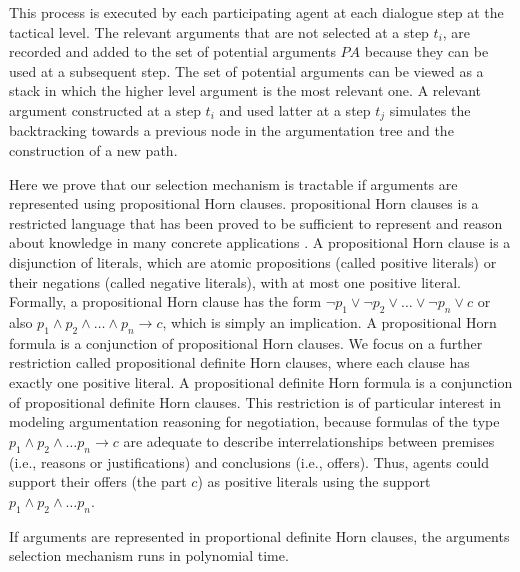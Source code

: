This process is executed by each participating agent at each dialogue step at the tactical level. The relevant arguments that
are not selected at a step $t_i$, are recorded and added to the set of potential arguments $PA$ because they can be used at a
subsequent step. The set of potential arguments can be viewed as a stack in which the higher level argument is the most relevant one.
A relevant argument constructed at a step $t_i$ and used latter at a step $t_j$ simulates the backtracking towards a previous node in
the argumentation tree and the construction of a new path.

Here we prove that our selection mechanism is tractable if arguments are represented using propositional Horn clauses.
propositional Horn clauses is a restricted language that has been proved to be sufficient to represent and reason about
knowledge in many concrete applications \cite{BentaharIEEEIS2007}. A propositional Horn clause is a disjunction of literals, which are
atomic propositions (called positive literals) or their negations (called negative literals), with at most one positive literal.
Formally, a propositional Horn clause has the form $\neg p_1 \vee \neg p_2 \vee \dots \vee \neg p_n \vee c$ or also $p_1 \wedge p_2
\wedge \dots \wedge p_n \rightarrow c$, which is simply an implication. A propositional Horn formula is a conjunction of
propositional Horn clauses. We focus on a further restriction called propositional definite Horn clauses, where each clause has
exactly one positive literal. A propositional definite Horn formula is a conjunction of propositional definite Horn clauses.
This restriction is of particular interest in modeling argumentation reasoning for negotiation, because formulas of the
type $p_1 \wedge p_2 \wedge \dots p_n \rightarrow c$ are adequate to describe interrelationships between premises (i.e., reasons or
justifications) and conclusions (i.e., offers). Thus, agents could support their offers (the part $c$) as positive literals using the
support $p_1 \wedge p_2 \wedge \dots p_n$.

\begin{theorem}\label{Complexity1}
If arguments are represented in proportional definite Horn clauses, the arguments selection mechanism runs in polynomial time.
\end{theorem}

